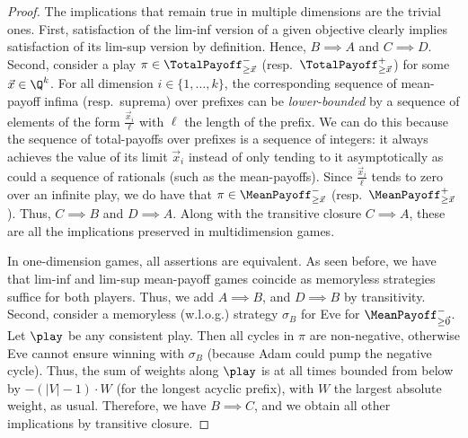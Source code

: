 \begin{proof}
The implications that remain true in multiple dimensions are the trivial ones. First, satisfaction of the lim-inf version of a given objective clearly implies satisfaction of its lim-sup version by definition. Hence, $B \implies A$ and $C \implies D$. Second, consider a play $\pi \in \TotalPayoff^{-}_{\geq \vec{x}}$ (resp.~$\TotalPayoff^{+}_{\geq \vec{x}}$) for some $\vec{x} \in \Q^{k}$. For all dimension $i \in \{1, \ldots{}, k\}$, the corresponding sequence of mean-payoff infima (resp.~suprema) over prefixes can be \textit{lower-bounded} by a sequence of elements of the form $\frac{\vec{x}_i}{\ell}$ with $\ell$ the length of the prefix. We can do this because the sequence of total-payoffs over prefixes is a sequence of integers: it always achieves the value of its limit $\vec{x}_i$ instead of only tending to it asymptotically as could a sequence of rationals (such as the mean-payoffs). Since $\frac{\vec{x}_i}{\ell}$ tends to zero over an infinite play, we do have that $\pi \in \MeanPayoff^{-}_{\geq \vec{x}}$ (resp.~$\MeanPayoff^{+}_{\geq \vec{x}}$). Thus, $C \implies B$ and $D \implies A$. Along with the transitive closure $C \implies A$, these are all the implications preserved in multidimension games.


In one-dimension games, all assertions are equivalent. As seen before, we have that lim-inf and lim-sup mean-payoff games coincide as memoryless strategies suffice for both players. Thus, we add $A \implies B$, and $D \implies B$ by transitivity. Second, consider a memoryless (w.l.o.g.) strategy $\sigma_B$ for Eve for $\MeanPayoff^{-}_{\geq \vec{0}}$. Let $\play$ be any consistent play. Then all cycles in $\pi$ are non-negative, otherwise Eve cannot ensure winning with $\sigma_B$ (because Adam could pump the negative cycle). Thus, the sum of weights along $\play$ is at all times bounded from below by $-(\vert V\vert-1)\cdot W$ (for the longest acyclic prefix), with $W$ the largest absolute weight, as usual. Therefore, we have $B \implies C$, and we obtain all other implications by transitive closure.


\end{proof}

